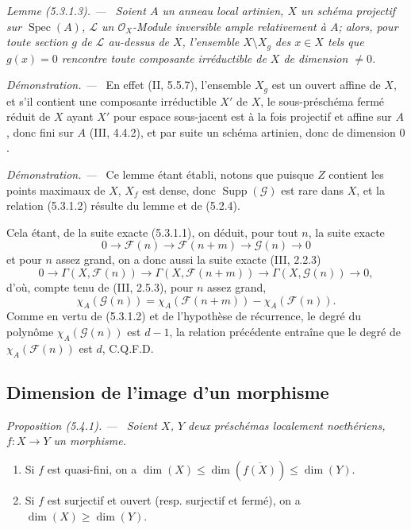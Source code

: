 \documentclass[10pt,oneside]{book}
\newcommand{\oldpage}[2][]{%
  \setcounter{footnote}{0}%
  \marginpar{\scriptsize\textbf{#1}~|~#2}\ignorespaces}
\newenvironment{proposition}[1][]{%
  \par\medskip\noindent\itshape Proposition (#1). ---\ }{\par}
\newenvironment{lemma}[1][]{%
  \par\medskip\noindent\itshape Lemme (#1). ---\ }{\par}
\newenvironment{proof}{%
  \par\medskip\noindent\textit{Démonstration. ---\ }}{\par}
\begin{document}
\begin{lemma}[5.3.1.3]
\label{IV.2.s5.3.1.3-fr}
Soient $A$ un anneau local artinien, $X$ un schéma projectif sur
$\operatorname{Spec}(A)$, $\mathcal L$ un $\mathcal O_X$-Module inversible
ample relativement à $A$; alors, pour toute section $g$ de $\mathcal L$
au-dessus de $X$, l'ensemble $X\setminus X_g$ des $x\in X$ tels que $g(x)=0$ rencontre
toute composante irréductible de $X$ de dimension $\ne0$.
\end{lemma}

\begin{proof}
En effet (II, 5.5.7), l'ensemble $X_g$ est un ouvert affine de $X$, et s'il
contient une composante irréductible $X'$ de $X$, le sous-préschéma fermé
réduit de $X$ ayant $X'$ pour espace sous-jacent est à la fois projectif et
affine sur $A$, donc fini sur $A$ (III, 4.4.2), et par suite un schéma
artinien, donc de dimension $0$.
\end{proof}

\begin{proof}
Ce lemme étant établi, notons que puisque $Z$ contient les points maximaux de
$X$, $X_f$ est dense, donc $\operatorname{Supp}(\mathcal G)$ est rare dans
$X$, et la relation (5.3.1.2) résulte du lemme et de (5.2.4).

\oldpage[IV-2]{93}

Cela étant, de la suite exacte (5.3.1.1), on déduit, pour tout $n$, la suite
exacte
\[
0\longrightarrow\mathcal F(n)\longrightarrow\mathcal F(n+m)
\longrightarrow\mathcal G(n)\longrightarrow0
\]
et pour $n$ assez grand, on a donc aussi la suite exacte (III, 2.2.3)
\[
0\longrightarrow\Gamma(X,\mathcal F(n))
\longrightarrow\Gamma(X,\mathcal F(n+m))
\longrightarrow\Gamma(X,\mathcal G(n))\longrightarrow0,
\]
d'où, compte tenu de (III, 2.5.3), pour $n$ assez grand,
\[
\chi_A(\mathcal G(n))
=\chi_A(\mathcal F(n+m))-\chi_A(\mathcal F(n)).
\]
Comme en vertu de (5.3.1.2) et de l'hypothèse de récurrence, le degré du
polynôme $\chi_A(\mathcal G(n))$ est $d-1$, la relation précédente entraîne
que le degré de $\chi_A(\mathcal F(n))$ est $d$, C.Q.F.D.
\end{proof}

\subsection{Dimension de l'image d'un morphisme}
\label{IV.2.s5.4-fr}

\begin{proposition}[5.4.1]
\label{IV.2.s5.4.1-fr}
Soient $X$, $Y$ deux préschémas localement noethériens, $f:X\to Y$ un
morphisme.
\begin{enumerate}
\item[(i)] Si $f$ est quasi-fini, on a
$\dim(X)\leq\dim(\overline{f(X)})\leq\dim(Y)$.
\item[(ii)] Si $f$ est surjectif et ouvert (resp. surjectif et fermé), on a
$\dim(X)\geq\dim(Y)$.
\end{enumerate}
\end{proposition}
\end{document}
